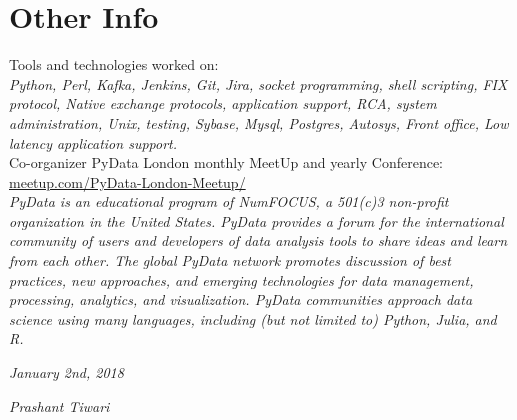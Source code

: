 \documentclass[]{friggeri-cv}
\begin{document}
\section{Other Info}
Tools and technologies worked on:\\
\emph{ Python, Perl, Kafka, Jenkins, Git, Jira, socket programming, shell scripting, FIX protocol, Native exchange protocols, application support, RCA, system administration, Unix, testing, Sybase, Mysql, Postgres, Autosys, Front office, Low latency application support.}
\\

Co-organizer PyData London monthly MeetUp and yearly Conference:\\
\href{https://www.meetup.com/PyData-London-Meetup/}{meetup.com/PyData-London-Meetup/}\\
\emph{PyData is an educational program of NumFOCUS, a 501(c)3 non-profit organization in the United States. PyData provides a forum for the international community of users and developers of data analysis tools to share ideas and learn from each other. The global PyData network promotes discussion of best practices, new approaches, and emerging technologies for data management, processing, analytics, and visualization. PyData communities approach data science using many languages, including (but not limited to) Python, Julia, and R.}
\\
\begin{flushleft}
\emph{January 2nd, 2018}
\end{flushleft}
\begin{flushright}
\emph{Prashant Tiwari}
\end{flushright}
\end{document}
